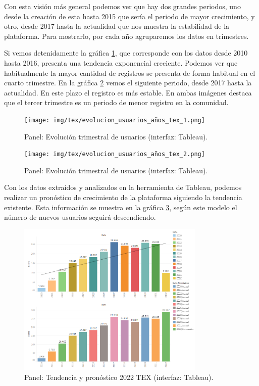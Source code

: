 \documentclass[a4paper, 12pt]{book}
\begin{document}
Con esta visión más general podemos ver que hay dos grandes periodos, uno desde la creación de esta hasta 2015 que sería el periodo de mayor crecimiento, y otro, desde 2017 hasta la actualidad que nos muestra la estabilidad de la plataforma. Para mostrarlo, por cada año agruparemos los datos en trimestres. 

Si vemos detenidamente la gráfica \ref{figura:evo_users_trim_tex}, que corresponde con los datos desde 2010 hasta 2016, presenta una tendencia exponencial creciente. Podemos ver que habitualmente la mayor cantidad de registros se presenta de forma habitual en el cuarto trimestre. En la gráfica \ref{figura:evo_users_trim_tex_2} vemos el siguiente periodo, desde 2017 hasta la actualidad. En este plazo el registro es más estable. En ambas imágenes destaca que el tercer trimestre es un periodo de menor registro en la comunidad. 

\begin{figure}[ht]
    \centering
    \texttt{[image: img/tex/evolucion\_usuarios\_años\_tex\_1.png]}
    \caption{Panel: Evolución trimestral de usuarios (interfaz: Tableau).}
    \label{figura:evo_users_trim_tex}
\end{figure}

\begin{figure}[ht]
    \centering
    \texttt{[image: img/tex/evolucion\_usuarios\_años\_tex\_2.png]}
    \caption{Panel: Evolución trimestral de usuarios (interfaz: Tableau).}
    \label{figura:evo_users_trim_tex_2}
\end{figure}

Con los datos extraídos y analizados en la herramienta de Tableau, podemos realizar un pronóstico de crecimiento de la plataforma siguiendo la tendencia existente. Esta información se muestra en la gráfica \ref{figura:tendencia_tex}, según este modelo el número de nuevos usuarios seguirá descendiendo.

\begin{figure}[ht]
    \centering
    \includegraphics[width=0.8\textwidth]{img/tex/Tendencia_pronostico_TEX.png}
    \caption{Panel: Tendencia y pronóstico 2022 TEX (interfaz: Tableau).}
    \label{figura:tendencia_tex}
\end{figure}
\end{document}
